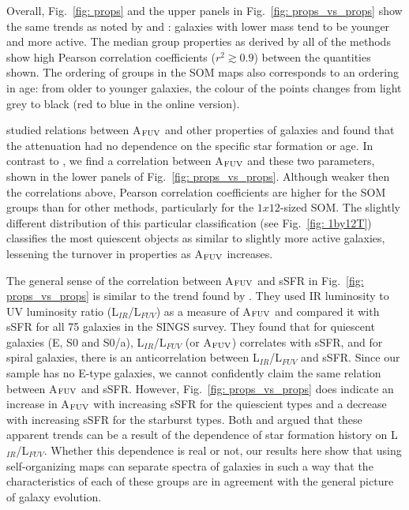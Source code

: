         Overall, Fig.~\ref{fig: props} and the upper panels in Fig.~\ref{fig: props_vs_props} show the same trends as noted by  and :
        galaxies with lower mass tend to be younger and more active.
        The median group properties as derived by all of the methods show high Pearson correlation coefficients ($r^2\gtrsim 0.9$) between the quantities shown.
        The ordering of groups in the SOM maps also corresponds to an ordering in age:    
        from older to younger galaxies, the colour of the points changes from light grey to black (red to blue in the online version).
        
         studied relations between A$_{\rm {FUV}}$ and other properties of galaxies and found that the attenuation had no dependence on the specific star formation or age.
        In contrast to , we find a correlation between A$_{\rm {FUV}}$ and these two parameters, shown in the lower panels of Fig.~\ref{fig: props_vs_props}.
        Although weaker then the correlations above, Pearson correlation coefficients are higher for the SOM groups than for other methods, particularly for the $1x12$-sized SOM. 
        The slightly different distribution of this particular classification (see Fig.~\ref{fig: 1by12T}) classifies the most quiescent objects as similar to slightly more active galaxies, lessening the turnover in properties as A$_{\rm {FUV}}$ increases.
        
        The general sense of the correlation between A$_{\rm {FUV}}$ and sSFR in Fig.~\ref{fig: props_vs_props} is similar to the trend found by \cite{Dale07}.
        They used IR luminosity to UV luminosity ratio (L$_{IR}$/L$_{FUV}$) as a measure of A$_{\rm {FUV}}$ and compared it with sSFR for all 75 galaxies in the SINGS survey.
        They found that for quiescent galaxies (E, S0 and S0/a), L$_{IR}$/L$_{FUV}$ (or A$_{\rm {FUV}}$) correlates with sSFR, and for spiral galaxies, there is an anticorrelation between L$_{IR}$/L$_{FUV}$ and sSFR.
        Since our sample has no E-type galaxies, we cannot confidently claim the same relation between A$_{\rm {FUV}}$ and sSFR. 
        However, Fig.~\ref{fig: props_vs_props} does indicate an increase in A$_{\rm {FUV}}$ with increasing sSFR for the quiescient types and a decrease with increasing sSFR for the starburst types.
        Both \cite{Dale07} and  argued that these apparent trends can be a result of the dependence of star formation history on L$_{IR}$/L$_{FUV}$.
        Whether this dependence is real or not, our results here show that using self-organizing maps can separate spectra of galaxies in such a way that the characteristics of each of these groups are in agreement with the general picture of galaxy evolution.
          
